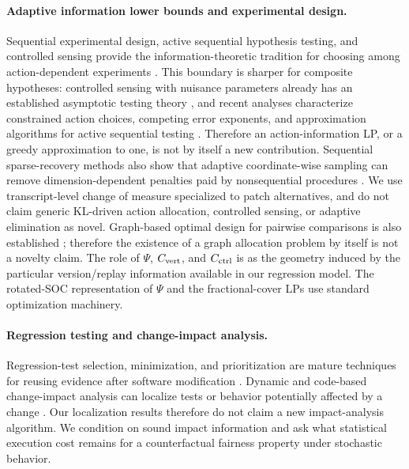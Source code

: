 \paragraph{Adaptive information lower bounds and experimental design.}
Sequential experimental design, active sequential hypothesis testing, and
controlled sensing provide the information-theoretic tradition for choosing
among action-dependent experiments
\cite{Chernoff1959,NaghshvarJavidi2013,NitinawaratAtiaVeeravalli2013,
NitinawaratVeeravalli2015,CohenZhao2015}.  This boundary is sharper for composite hypotheses: controlled sensing
with nuisance parameters already has an established asymptotic testing theory
\cite{DeshmukhVeeravalliBhashyam2021}, and recent analyses characterize
constrained action choices, competing error exponents, and approximation
algorithms for active sequential testing
\cite{HsuWang2025,GanJiaLiTayur2025}. Therefore an action-information LP,
or a greedy approximation to one, is not by itself a new contribution.
Sequential sparse-recovery methods also show that adaptive coordinate-wise
sampling can remove dimension-dependent penalties paid by nonsequential
procedures \cite{MalloyNowak2014}.  We use transcript-level change of measure specialized to patch alternatives, and do not claim generic KL-driven action allocation, controlled sensing, or adaptive elimination as novel.  Graph-based optimal
design for pairwise comparisons is also established
\cite{SinghSinghDavidov2025}; therefore the existence of a graph allocation
problem by itself is not a novelty claim.  The role of $\Psi$, $C_{\rm vert}$,
and $C_{\rm ctrl}$ is as the geometry induced by the particular
version/replay information available in our regression model.  The rotated-SOC
representation of $\Psi$ and the fractional-cover LPs use standard optimization
machinery.

\paragraph{Regression testing and change-impact analysis.}
Regression-test selection, minimization, and prioritization are mature
techniques for reusing evidence after software modification
\cite{RothermelHarrold1996,ElbaumMalishevskyRothermel2002,YooHarman2012}.
Dynamic and code-based change-impact analysis can localize tests or behavior
potentially affected by a change
\cite{LawRothermel2003,RenEtAl2004,LiSunLeungZhang2013}.  Our localization
results therefore do not claim a new impact-analysis algorithm.  We condition
on sound impact information and ask what statistical execution cost remains for
a counterfactual fairness property under stochastic behavior.

